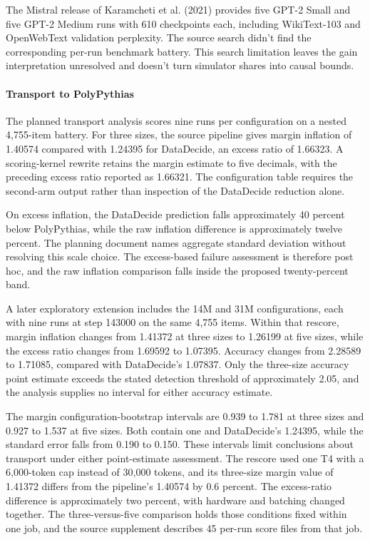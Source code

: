 The Mistral release of Karamcheti et al. (2021) provides five GPT-2 Small and five GPT-2 Medium runs with 610 checkpoints each, including WikiText-103 and OpenWebText validation perplexity. The source search didn't find the corresponding per-run benchmark battery. This search limitation leaves the gain interpretation unresolved and doesn't turn simulator shares into causal bounds.

\paragraph{Transport to PolyPythias}
The planned transport analysis scores nine runs per configuration on a nested 4,755-item battery. For three sizes, the source pipeline gives margin inflation of 1.40574 compared with 1.24395 for DataDecide, an excess ratio of 1.66323. A scoring-kernel rewrite retains the margin estimate to five decimals, with the preceding excess ratio reported as 1.66321. The configuration table requires the second-arm output rather than inspection of the DataDecide reduction alone.

On excess inflation, the DataDecide prediction falls approximately 40 percent below PolyPythias, while the raw inflation difference is approximately twelve percent. The planning document names aggregate standard deviation without resolving this scale choice. The excess-based failure assessment is therefore post hoc, and the raw inflation comparison falls inside the proposed twenty-percent band.

A later exploratory extension includes the 14M and 31M configurations, each with nine runs at step 143000 on the same 4,755 items. Within that rescore, margin inflation changes from 1.41372 at three sizes to 1.26199 at five sizes, while the excess ratio changes from 1.69592 to 1.07395. Accuracy changes from 2.28589 to 1.71085, compared with DataDecide's 1.07837. Only the three-size accuracy point estimate exceeds the stated detection threshold of approximately 2.05, and the analysis supplies no interval for either accuracy estimate.

The margin configuration-bootstrap intervals are 0.939 to 1.781 at three sizes and 0.927 to 1.537 at five sizes. Both contain one and DataDecide's 1.24395, while the standard error falls from 0.190 to 0.150. These intervals limit conclusions about transport under either point-estimate assessment. The rescore used one T4 with a 6,000-token cap instead of 30,000 tokens, and its three-size margin value of 1.41372 differs from the pipeline's 1.40574 by 0.6 percent. The excess-ratio difference is approximately two percent, with hardware and batching changed together. The three-versus-five comparison holds those conditions fixed within one job, and the source supplement describes 45 per-run score files from that job.

